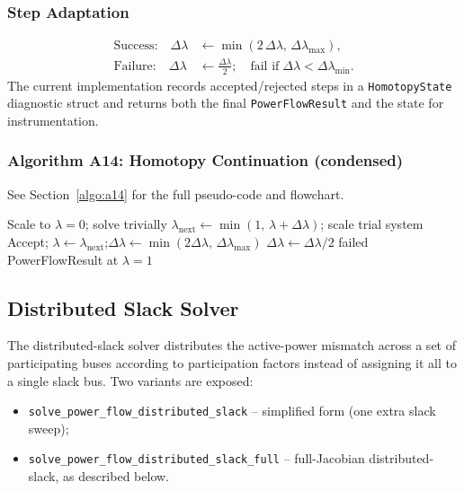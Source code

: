 \subsubsection{Step Adaptation}

\begin{align}
\text{Success:}\quad\Delta\lambda &\leftarrow \min(2\,\Delta\lambda,\,\Delta\lambda_{\max}), \\
\text{Failure:}\quad\Delta\lambda &\leftarrow \frac{\Delta\lambda}{2};\quad
\text{fail if}\;\Delta\lambda < \Delta\lambda_{\min}.
\end{align}
The current implementation records accepted/rejected steps in a
\texttt{HomotopyState} diagnostic struct and returns both the final
\texttt{PowerFlowResult} and the state for instrumentation.

\subsubsection{Algorithm A14: Homotopy Continuation (condensed)}
\label{algo:a14-inline}
See Section~\ref{algo:a14} for the full pseudo-code and flowchart.

\begin{algorithmic}[1]
  \State Scale to $\lambda{=}0$; solve trivially
    \State $\lambda_{\mathrm{next}} \gets \min(1,\,\lambda + \Delta\lambda)$;\quad
      scale trial system
      \State Accept; $\lambda \gets \lambda_{\mathrm{next}}$;\quad $\Delta\lambda \gets \min(2\Delta\lambda,\,\Delta\lambda_{\max})$
    \Else
      \State $\Delta\lambda \gets \Delta\lambda/2$
      \If{$\Delta\lambda < \Delta\lambda_{\min}$} \Return failed \EndIf
    \EndIf
  \EndWhile
  \State \Return PowerFlowResult at $\lambda{=}1$
\EndProcedure
\end{algorithmic}

\subsection{Distributed Slack Solver}
\label{sec:distributed-slack}

The distributed-slack solver distributes the active-power mismatch across a set
of participating buses according to participation factors instead of assigning
it all to a single slack bus.  Two variants are exposed:
\begin{itemize}
  \item \texttt{solve\_power\_flow\_distributed\_slack} -- simplified form
  (one extra slack sweep);
  \item \texttt{solve\_power\_flow\_distributed\_slack\_full} -- full-Jacobian
  distributed-slack, as described below.
\end{itemize}


